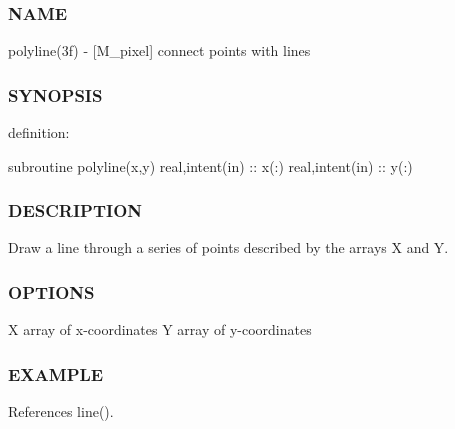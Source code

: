 \subsubsection*{N\+A\+ME}

polyline(3f) -\/ \mbox{[}M\+\_\+pixel\mbox{]} connect points with lines 

\subsubsection*{S\+Y\+N\+O\+P\+S\+IS}

definition\+:

subroutine polyline(x,y) real,intent(in) \+:\+: x(\+:) real,intent(in) \+:\+: y(\+:)

\subsubsection*{D\+E\+S\+C\+R\+I\+P\+T\+I\+ON}

Draw a line through a series of points described by the arrays X and Y.

\subsubsection*{O\+P\+T\+I\+O\+NS}

X array of x-\/coordinates Y array of y-\/coordinates

\subsubsection*{E\+X\+A\+M\+P\+LE}

References line().

